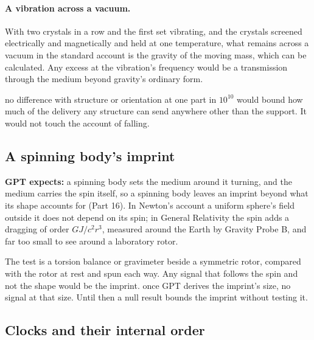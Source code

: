 \documentclass[11pt,a4paper]{article}
\begin{document}
\paragraph{A vibration across a vacuum.} With two crystals in a row and the first set vibrating, and the crystals screened electrically and magnetically and held at one temperature, what remains across a vacuum in the standard account is the gravity of the moving mass, which can be calculated. Any excess at the vibration's frequency would be a transmission through the medium beyond gravity's ordinary form.

 no difference with structure or orientation at one part in $10^{10}$ would bound how much of the delivery any structure can send anywhere other than the support. It would not touch the account of falling.

\subsection{A spinning body's imprint}\label{sec:spin}

\begin{hypbar}
\textbf{GPT expects:} a spinning body sets the medium around it turning, and the medium carries the spin itself, so a spinning body leaves an imprint beyond what its shape accounts for (Part 16). In Newton's account a uniform sphere's field outside it does not depend on its spin; in General Relativity the spin adds a dragging of order $GJ/c^2r^3$, measured around the Earth by Gravity Probe B,\footnotemark{} and far too small to see around a laboratory rotor.
\end{hypbar}

 The test is a torsion balance or gravimeter beside a symmetric rotor, compared with the rotor at rest and spun each way. Any signal that follows the spin and not the shape would be the imprint.  once GPT derives the imprint's size, no signal at that size. Until then a null result bounds the imprint without testing it.

\subsection{Clocks and their internal order}\label{sec:clocks}
\end{document}
